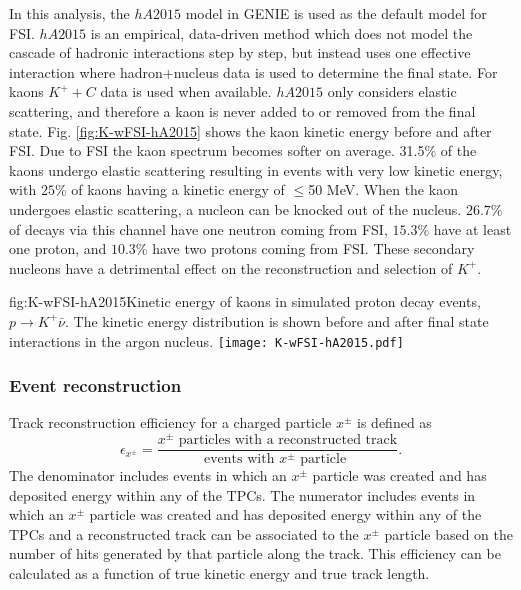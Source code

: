 In this analysis, the $hA2015$ model in GENIE is used as the default model for FSI.  $hA2015$ is an empirical, data-driven method which does not model the cascade of hadronic interactions step by step, but instead uses one effective interaction where hadron+nucleus data is used to determine the final state.  
For kaons $K^{+}+C$ data 
is used when available. $hA2015$ only considers elastic scattering, and therefore a kaon is never added to or removed from the final state. Fig. \ref{fig:K-wFSI-hA2015} shows the kaon kinetic energy before and after FSI. Due to FSI the kaon spectrum becomes softer on average. 31.5$\%$ of the kaons undergo elastic scattering resulting in events with very low kinetic energy, with $25\%$ of kaons having a kinetic energy of $\le$50 MeV. When the kaon undergoes elastic scattering, a nucleon can be knocked out of the nucleus. $26.7\%$ of decays via this channel have one neutron coming from FSI, $15.3\%$ have at least one proton, and $10.3\%$ have two protons coming from FSI. These secondary nucleons have a detrimental effect on the reconstruction and selection of $K^{+}$.

\begin{dunefigure}{fig:K-wFSI-hA2015}{Kinetic energy of kaons in simulated proton decay events, $p\rightarrow K^{+} \bar{\nu}$.  The kinetic energy distribution is shown before and after final state interactions in the argon nucleus.}
\texttt{[image: K-wFSI-hA2015.pdf]}
\end{dunefigure}


\subsubsection{Event reconstruction}
\label{sec:event-reconstruction}


Track reconstruction efficiency for a charged particle $x^{\pm}$ is defined as 
\begin{equation}
\epsilon_{x^{\pm}} = \frac{\mbox{$x^{\pm}$ particles with a reconstructed track}}{\mbox{events with $x^{\pm}$ particle }}.
\end{equation}
The denominator includes events in which an $x^{\pm}$ particle was created and has deposited energy within any of the TPCs.  The numerator includes events in which an $x^{\pm}$ particle was created and has deposited energy within any of the TPCs and a reconstructed track can be associated to the $x^{\pm}$ particle based on the number of hits generated by that particle along the track. This efficiency can be calculated as a function of true kinetic energy and true track length.

